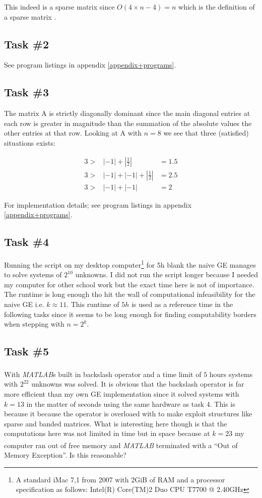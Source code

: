 \documentclass[10pt, a4paper]{article}
\newcommand{\matlab}{\small{\emph{MATLAB\textsuperscript{\textregistered}}}}
\begin{document}
This indeed is a sparse matrix since $O(4\times n -4) = n$ which is the definition of a sparse matrix \cite{sparsemat}.

\subsection{Task \#2}
See program listings in appendix \ref{appendix+programs}.

\subsection{Task \#3}
The matrix A is strictly diagonally dominant since the main diagonal entries at each row is greater in magnitude than the summation of the absolute values the other entries at that row. Looking at A with $n=8$ we see that three (satisfied) situations exists:

\begin{eqnarray}
		3 > & |-1|+|\frac{1}{2}|	  &=  1.5 \nonumber \\
		3 > & |-1|+|-1|+|\frac{1}{2}| &=  2.5 \nonumber \\
		3 > & |-1|+|-1|				  &=  2   \nonumber
\end{eqnarray}

For implementation details; see program listings in appendix \ref{appendix+programs}.

\subsection{Task \#4}
Running the script on my desktop computer\footnote{A standard iMac 7,1 from 2007 with $2$GiB of RAM and a processor specification as follows: Intel(R) Core(TM)2 Duo CPU T7700  @ 2.40GHz} for 5h blank the naive GE manages to solve systems of $2^{10}$ unknowns. I did not run the script longer because I needed my computer for other school work but the exact time here is not of importance. The runtime is long enough tho hit the wall of computational infeasibility for the naive GE i.e. $k\approx11$. This runtime of $5h$ is used as a reference time in the following tasks since it seems to be long enough for finding computability borders when stepping with $n=2^k$.

\subsection{Task \#5}
With \matlab{}s built in backslash operator and a time limit of $5$ hours systems with $2^{22}$ unknowns was solved.  It is obvious that the backslash operator is far more efficient than my own GE implementation since it solved systems with $k=13$ in the matter of seconds using the same hardware as task 4. This is because it because the operator is overloaed with to make exploit structures like sparse and banded matrices. What is interesting here though is that the computations here was not limited in time but in space because at $k=23$ my computer ran out of free memory and \matlab{} terminated with a ``Out of Memory Exception''. Is this reasonable?
\end{document}
